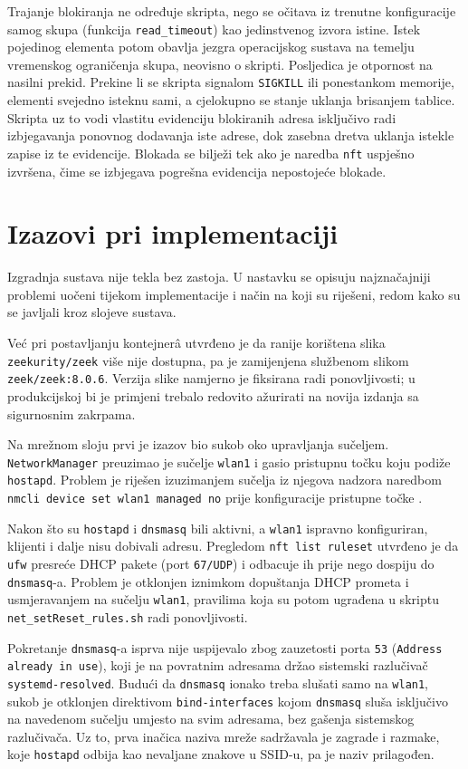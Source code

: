 Trajanje blokiranja ne određuje skripta, nego se očitava iz trenutne  konfiguracije samog skupa (funkcija \texttt{read\_timeout}) kao jedinstvenog izvora istine. Istek pojedinog
elementa potom obavlja jezgra operacijskog sustava na temelju vremenskog ograničenja skupa, neovisno o skripti. Posljedica je otpornost na nasilni prekid. Prekine li se skripta
signalom \texttt{SIGKILL} ili  ponestankom memorije, elementi svejedno isteknu sami, a cjelokupno se stanje uklanja brisanjem tablice. Skripta uz to vodi
vlastitu evidenciju blokiranih adresa isključivo radi izbjegavanja ponovnog dodavanja iste adrese, dok zasebna dretva uklanja istekle zapise iz te evidencije. Blokada se bilježi
tek ako je naredba \texttt{nft} uspješno izvršena, čime se izbjegava pogrešna evidencija nepostojeće blokade.
\newpage
\section{Izazovi pri implementaciji}

Izgradnja sustava nije tekla bez zastoja. U nastavku se opisuju najznačajniji problemi uočeni tijekom implementacije i način na koji su riješeni, redom kako su se javljali kroz
slojeve sustava.

Već pri postavljanju kontejnerâ utvrđeno je da ranije korištena slika \texttt{zeekurity/zeek} više nije dostupna, pa je zamijenjena službenom slikom \texttt{zeek/zeek:8.0.6}.
Verzija slike namjerno je fiksirana radi ponovljivosti; u produkcijskoj bi je primjeni trebalo redovito ažurirati na novija izdanja sa sigurnosnim zakrpama.

Na mrežnom sloju prvi je izazov bio sukob oko upravljanja sučeljem. \texttt{NetworkManager} preuzimao je sučelje \texttt{wlan1} i gasio pristupnu točku koju podiže \texttt{hostapd}.
Problem je riješen izuzimanjem sučelja iz njegova nadzora naredbom \texttt{nmcli device set wlan1 managed no} prije konfiguracije pristupne točke \cite{arch_softap}.

Nakon što su \texttt{hostapd} i \texttt{dnsmasq} bili aktivni, a \texttt{wlan1} ispravno konfiguriran, klijenti i dalje nisu dobivali adresu. Pregledom \texttt{nft list ruleset}
utvrđeno je da \texttt{ufw} presreće DHCP pakete (port \texttt{67/UDP}) i odbacuje ih prije nego dospiju do \texttt{dnsmasq}-a. Problem je otklonjen iznimkom dopuštanja DHCP prometa i
usmjeravanjem na sučelju \texttt{wlan1}, pravilima koja su potom ugrađena u skriptu \texttt{net\_setReset\_rules.sh} radi ponovljivosti.

Pokretanje \texttt{dnsmasq}-a isprva nije uspijevalo zbog zauzetosti porta \texttt{53} (\texttt{Address already in use}), koji je na povratnim adresama držao sistemski razlučivač
\texttt{systemd-resolved}. Budući da \texttt{dnsmasq} ionako treba slušati samo na \texttt{wlan1}, sukob je otklonjen direktivom \texttt{bind-interfaces} kojom \texttt{dnsmasq} sluša
isključivo na navedenom sučelju umjesto na svim adresama, bez gašenja sistemskog razlučivača. Uz to, prva inačica naziva mreže sadržavala je zagrade i razmake, koje \texttt{hostapd}
odbija kao nevaljane znakove u SSID-u, pa je naziv prilagođen.

